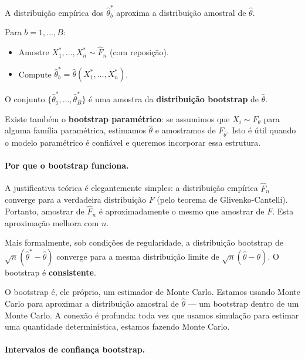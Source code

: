 \documentclass{tufte-handout}
\begin{document}
A distribuição empírica dos $\hat{\theta}_b^*$ aproxima a distribuição amostral de $\hat{\theta}$.

\begin{defn}
    Para $b = 1, \dots, B$:
    \begin{itemize}
        \item Amostre $X_1^*, \dots, X_n^* \sim \hat{F}_n$ (com reposição).
        \item Compute $\hat{\theta}_b^* = \hat{\theta}(X_1^*, \dots, X_n^*)$.
    \end{itemize}
    O conjunto $\{\hat{\theta}_1^*, \dots, \hat{\theta}_B^*\}$ é uma amostra da \textbf{distribuição bootstrap} de $\hat{\theta}$.
\end{defn}

Existe também o \textbf{bootstrap paramétrico}: se assumimos que $X_i \sim F_\theta$ para alguma família paramétrica, estimamos $\hat{\theta}$ e amostramos de $F_{\hat{\theta}}$. Isto é útil quando o modelo paramétrico é confiável e queremos incorporar essa estrutura.

\paragraph{Por que o bootstrap funciona.}

A justificativa teórica é elegantemente simples: a distribuição empírica $\hat{F}_n$ converge para a verdadeira distribuição $F$ (pelo teorema de Glivenko-Cantelli). Portanto, amostrar de $\hat{F}_n$ é aproximadamente o mesmo que amostrar de $F$. Esta aproximação melhora com $n$.

Mais formalmente, sob condições de regularidade, a distribuição bootstrap de $\sqrt{n}(\hat{\theta}^* - \hat{\theta})$ converge para a mesma distribuição limite de $\sqrt{n}(\hat{\theta} - \theta)$. O bootstrap é \textbf{consistente}.

\begin{remark}
    O bootstrap é, ele próprio, um estimador de Monte Carlo. Estamos usando Monte Carlo para aproximar a distribuição amostral de $\hat{\theta}$ --- um bootstrap dentro de um Monte Carlo. A conexão é profunda: toda vez que usamos simulação para estimar uma quantidade determinística, estamos fazendo Monte Carlo.
\end{remark}

\paragraph{Intervalos de confiança bootstrap.}
\end{document}
